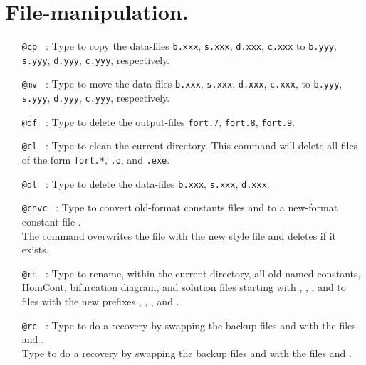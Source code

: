 \documentclass[12pt]{report}
\begin{document}
\section{ File-manipulation.} 

\begin{itemize}

\item[\tt @cp]~:
  Type  
  to copy the data-files 
  {\tt b.xxx}, {\tt s.xxx}, {\tt d.xxx}, {\tt c.xxx} to
  {\tt b.yyy}, {\tt s.yyy}, {\tt d.yyy}, {\tt c.yyy}, respectively.

\item[\tt @mv]~:
  Type  
  to move the data-files 
  {\tt b.xxx}, {\tt s.xxx}, {\tt d.xxx}, {\tt c.xxx}, to
  {\tt b.yyy}, {\tt s.yyy}, {\tt d.yyy}, {\tt c.yyy}, respectively.

\item[\tt @df]~:
  Type  
  to delete the output-files 
  {\tt fort.7}, {\tt fort.8}, {\tt fort.9}.

\item[\tt @cl]~:
  Type  
  to clean the current directory.
  This command will delete  all files of the form
  {\tt fort.*}, {\tt *.o}, and {\tt *.exe}.

\item[\tt @dl]~:
  Type  
 to delete the data-files 
  {\tt b.xxx}, {\tt s.xxx}, {\tt d.xxx}.

\item[\tt @cnvc]~:
  Type  to convert old-format constants files
 and  to a new-format constant file
.\\
  The command  overwrites the file 
  with the new style file and deletes  if it exists.

\item[\tt @rn]~:
  Type  to rename, within the current directory, all
  old-named constants, HomCont, bifurcation
  diagram, and solution files starting with , ,
  , and  to files with the new prefixes
  , , , and .

\item[\tt @rc]~:
  Type  to do a recovery by swapping the backup files
   and  with the files
   and .\\
  Type  to do a recovery by swapping the backup files
   and  with the files
   and .


\end{itemize}
\end{document}
